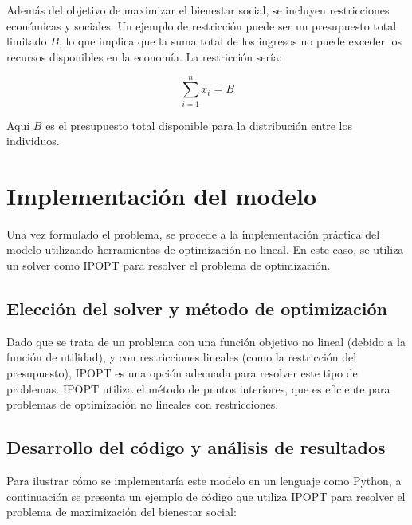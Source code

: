 \begin{flushleft}
	Además del objetivo de maximizar el bienestar social, se incluyen restricciones económicas y sociales. Un ejemplo de restricción puede ser un presupuesto total limitado $B$, lo que implica que la suma total de los ingresos no puede exceder los recursos disponibles en la economía. La restricción sería:
\end{flushleft}

$$
\sum_{i=1}^{n} x_{i}=B
$$

\begin{flushleft}
	Aquí $B$ es el presupuesto total disponible para la distribución entre los individuos.
\end{flushleft}

\section{Implementación del modelo}

\begin{flushleft}
	Una vez formulado el problema, se procede a la implementación práctica del modelo utilizando herramientas de optimización no lineal. En este caso, se utiliza un solver como IPOPT para resolver el problema de optimización.
\end{flushleft}

\subsection{Elección del solver y método de optimización}

\begin{flushleft}
	Dado que se trata de un problema con una función objetivo no lineal (debido a la función de utilidad), y con restricciones lineales (como la restricción del presupuesto), IPOPT es una opción adecuada para resolver este tipo de problemas. IPOPT utiliza el método de puntos interiores, que es eficiente para problemas de optimización no lineales con restricciones.
\end{flushleft}

\subsection{Desarrollo del código y análisis de resultados}

\begin{flushleft}
	Para ilustrar cómo se implementaría este modelo en un lenguaje como Python, a continuación se presenta un ejemplo de código que utiliza IPOPT para resolver el problema de maximización del bienestar social:
\end{flushleft}

